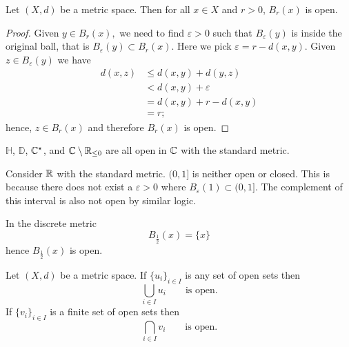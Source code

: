 
\begin{lemma}
    Let $(X, d)$ be a metric space. Then for all $x \in X$ and $r > 0$, $B_r(x)$ is open.
\end{lemma}

\begin{proof}
    Given
    $y \in B_r(x),$
    we need to find
    $\varepsilon > 0$
    such that
    $B_{\varepsilon}(y)$
    is inside the original ball, that is 
    $B_{\varepsilon}(y) \subset B_r(x).$
    Here we pick 
    $\varepsilon = r - d(x, y).$
    Given 
    $z \in B_{\varepsilon}(y)$ 
    we have
    \begin{align*}
        d(x, z) &\leq d(x, y) + d(y, z) \\
                &< d(x, y) + \varepsilon \\
                &= d(x, y) + r - d(x, y) \\
                &= r;
    \end{align*}
    hence, $z \in B_r(x)$ and therefore $B_r(x)$ is open.
\end{proof}

\begin{example}
    $\mathbb H$, $\mathbb D$, $\mathbb{C}^\star$, and $\mathbb{C} \setminus \mathbb{R}_{\leq 0}$ are all open in $\mathbb{C}$ with the standard metric. 
\end{example}

\begin{example}
    Consider $\mathbb{R}$ with the standard metric. $(0, 1]$ is neither open or closed. This is because there does not exist a $\varepsilon > 0$ where $B_{\varepsilon}(1) \subset (0, 1]$. The complement of this interval is also not open by similar logic.
\end{example}

\begin{example}
    In the discrete metric
    \[ B_{\frac12}(x) = \{ x \} \]
    hence $B_{\frac12}(x)$ is open.
\end{example}

\begin{lemma}
    Let $(X, d)$ be a metric space. If
    $\{ u_i \}_{i \in I}$
    is any set of open sets then
    \[ \bigcup_{i \in I} u_i \qquad \text{is open}. \]
    If
    $\{ v_i \}_{i \in I}$
    is a finite set of open sets then
    \[ \bigcap_{i \in I} v_i \qquad \text{is open}. \]
\end{lemma}

